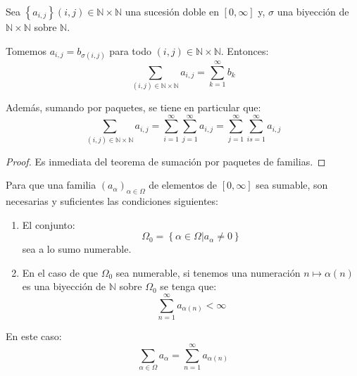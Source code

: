 \documentclass[12pt]{report}
\newcounter{it}
\theoremstyle{largebreak}
\begin{document}
    \begin{cor}
        Sea $\left\{a_{i,j} \right\}{(i,j)\in\mathbb{N}\times\mathbb{N}}$ una sucesión doble en $[0,\infty]$ y, $\sigma$ una biyección de $\mathbb{N}\times\mathbb{N}$ sobre $\mathbb{N}$.

        Tomemos $a_{i,j }=b_{\sigma(i,j)}$ para todo $(i,j)\in\mathbb{N}\times\mathbb{N}$. Entonces:
        \begin{equation*}
            \sum_{(i,j)\in\mathbb{N}\times\mathbb{N}}a_{i,j }=\sum_{k=1 }^{\infty}b_k
        \end{equation*}

        Además, sumando por paquetes, se tiene en particular que:
        \begin{equation*}
            \sum_{(i,j)\in\mathbb{N}\times\mathbb{N}}a_{i,j }=\sum_{i=1 }^{\infty} \sum_{j=1 }^{\infty}a_{ i,j}=\sum_{j=1 }^{\infty} \sum_{is=1 }^{\infty}a_{ i,j}
        \end{equation*}
    \end{cor}

    \begin{proof}
        Es inmediata del teorema de sumación por paquetes de familias.
    \end{proof}

    \begin{theor}
        Para que una familia $\left(a_\alpha \right)_{\alpha\in\Omega }$ de elementos de $[0,\infty]$ sea sumable, son necesarias y suficientes las condiciones siguientes:
        \begin{enumerate}
            \item El conjunto:
            \begin{equation*}
                \Omega_0=\left\{\alpha\in\Omega\Big|a_\alpha\neq0 \right\}
            \end{equation*}
            sea a lo sumo numerable.
            \item En el caso de que $\Omega_0$ sea numerable, si tenemos una numeración $n\mapsto\alpha(n)$ es una biyección de $\mathbb{N}$ sobre $\Omega_0$ se tenga que:
            \begin{equation*}
                \sum_{n=1 }^{\infty}a_{\alpha(n)}<\infty
            \end{equation*}
        \end{enumerate}
        En este caso:
        \begin{equation*}
            \sum_{\alpha\in\Omega }a_\alpha=\sum_{n=1 }^{\infty}a_{\alpha(n)}
        \end{equation*}

    \end{theor}
    
\end{document}

